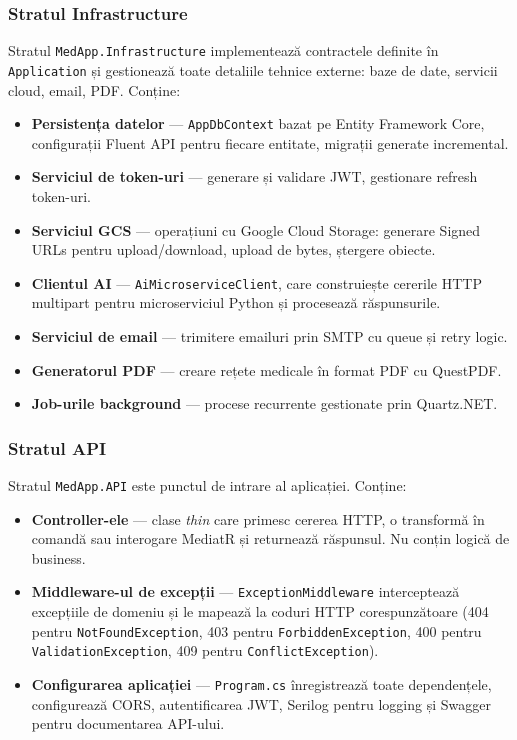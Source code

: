 \documentclass[12pt, a4paper]{report}
\begin{document}
\subsubsection{Stratul Infrastructure}

Stratul \texttt{MedApp.Infrastructure} implementează contractele definite în
\texttt{Application} și gestionează toate detaliile tehnice externe: baze de date,
servicii cloud, email, PDF. Conține:

\begin{itemize}
    \item \textbf{Persistența datelor} --- \texttt{AppDbContext} bazat pe Entity Framework
          Core, configurații Fluent API pentru fiecare entitate, migrații generate incremental.
    \item \textbf{Serviciul de token-uri} --- generare și validare JWT, gestionare
          refresh token-uri.
    \item \textbf{Serviciul GCS} --- operațiuni cu Google Cloud Storage: generare
          Signed URLs pentru upload/download, upload de bytes, ștergere obiecte.
    \item \textbf{Clientul AI} --- \texttt{AiMicroserviceClient}, care construiește
          cererile HTTP multipart pentru microserviciul Python și procesează răspunsurile.
    \item \textbf{Serviciul de email} --- trimitere emailuri prin SMTP cu queue și
          retry logic.
    \item \textbf{Generatorul PDF} --- creare rețete medicale în format PDF cu QuestPDF.
    \item \textbf{Job-urile background} --- procese recurrente gestionate prin Quartz.NET.
\end{itemize}

\subsubsection{Stratul API}

Stratul \texttt{MedApp.API} este punctul de intrare al aplicației. Conține:

\begin{itemize}
    \item \textbf{Controller-ele} --- clase \textit{thin} care primesc cererea HTTP, o
          transformă în comandă sau interogare MediatR și returnează răspunsul. Nu conțin
          logică de business.
    \item \textbf{Middleware-ul de excepții} --- \texttt{ExceptionMiddleware} interceptează
          excepțiile de domeniu și le mapează la coduri HTTP corespunzătoare (404 pentru
          \texttt{NotFoundException}, 403 pentru \texttt{ForbiddenException}, 400 pentru
          \texttt{ValidationException}, 409 pentru \texttt{ConflictException}).
    \item \textbf{Configurarea aplicației} --- \texttt{Program.cs} înregistrează toate
          dependențele, configurează CORS, autentificarea JWT, Serilog pentru logging și
          Swagger pentru documentarea API-ului.
\end{itemize}
\end{document}
